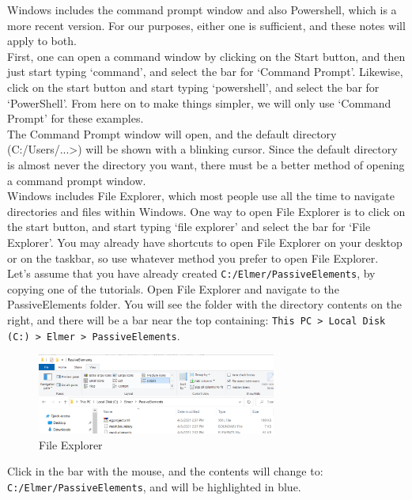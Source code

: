 Windows includes the command prompt window and also Powershell, which is a more recent version.  For our purposes, either one is sufficient, and these notes will apply to both.\\

First, one can open a command window by clicking on the Start button, and then just start typing `command', and select the bar for `Command Prompt'.  Likewise, click on the start button and start typing `powershell', and select the bar for `PowerShell'.  From here on to make things simpler, we will only use `Command Prompt' for these examples.\\

The Command Prompt window will open, and the default directory (C:/Users/...>) will be shown with a blinking cursor.  Since the default directory is almost never the directory you want, there must be a better method of opening a command prompt window.\\

Windows includes File Explorer, which most people use all the time to navigate directories and files within Windows.  One way to open File Explorer is to click on the start button, and start typing `file explorer' and select the bar for `File Explorer'.  You may already have shortcuts to open File Explorer on your desktop or on the taskbar, so use whatever method you prefer to open File Explorer.\\

Let's assume that you have already created \texttt{C:/Elmer/PassiveElements}, by copying one of the tutorials.  Open File Explorer and navigate to the PassiveElements folder.  You will see the folder with the directory contents on the right, and there will be a bar near the top containing: \texttt{This PC > Local Disk (C:) > Elmer > PassiveElements}.

\begin{figure}[H]
\centering
\includegraphics[width=0.7\textwidth]{cmd-1}
\caption{File Explorer}\label{fg:cmd-1}
\end{figure}

Click in the bar with the mouse, and the contents will change to: \texttt{C:/Elmer/PassiveElements}, and will be highlighted in blue.  

